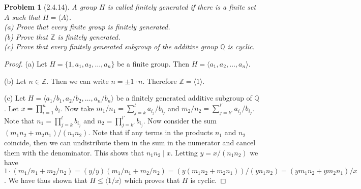 \documentclass{article}
\newtheorem{problem}{Problem}
\begin{document}
\begin{problem}[2.4.14]
A group $H$ is called \emph{finitely generated} if there is a finite set $A$ such that $H = \langle A \rangle$.\\
(a) Prove that every finite group is finitely generated.\\
(b) Prove that $\mathbb{Z}$ is finitely generated.\\
(c) Prove that every finitely generated subgroup of the additive group $\mathbb{Q}$ is cyclic.
\end{problem}
\begin{proof}
(a) Let $H = \{1, a_1, a_2, \dots , a_n\}$ be a finite group. Then $H = \langle a_1, a_2, \dots , a_n \rangle$.

(b) Let $n \in \mathbb{Z}$. Then we can write $n = \pm 1 \cdot n$. Therefore $\mathbb{Z} = \langle 1 \rangle$.

(c) Let $H = \langle a_1/b_1, a_2/b_2, \dots , a_n/b_n \rangle$ be a finitely generated additive subgroup of $\mathbb{Q}$. Let $x = \prod_{i=1}^{n} b_i$. Now take $m_1/n_1 = \sum_{j=k}^{l} a_{i_j}/b_{i_j}$ and $m_2/n_2 = \sum_{j=k'}^{l'} a_{i_j}/b_{i_j}$. Note that $n_1 = \prod_{j=k}^{l}b_{i_j}$ and $n_2 = \prod_{j=k'}^{l'}b_{i_j}$. Now consider the sum $(m_1n_2 + m_2n_1)/(n_1n_2)$. Note that if any terms in the products $n_1$ and $n_2$ coincide, then we can undistribute them in the sum in the numerator and cancel them with the denominator. This shows that $n_1n_2 \mid x$. Letting $y = x/(n_1n_2)$ we have $1 \cdot (m_1/n_1 + m_2/n_2) = (y/y)(m_1/n_1 + m_2/n_2) = (y(m_1n_2 + m_2n_1))/(yn_1n_2) = (ym_1n_2 + ym_2n_1)/x$. We have thus shown that $H \leq \langle 1/x \rangle$ which proves that $H$ is cyclic.
\end{proof}
\end{document}
